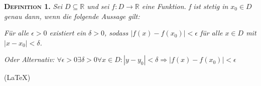 \documentclass[14pt,a4paper]{extarticle}
\begin{document}
    \noindent\textbf{\textsc{Definition 1.}} \textit{Sei $D \subseteq \mathbb{R}$ und sei $f: D \rightarrow \mathbb{R}$ eine Funktion. f ist stetig in $x_0 \in D$ genau dann, wenn die folgende Aussage gilt:}

    \textit{Für alle $\epsilon > 0$ existiert ein $\delta > 0$, sodass $| f(x)-f(x_0) | < \epsilon$ für alle $x \in D$ mit $| x-x_0 | < \delta$.}

    \textit{Oder Alternativ: $\forall \epsilon > 0 \exists \delta > 0 \forall x \in D : |y-y_0| < \delta \Rightarrow |f(x)-f(x_0)| < \epsilon$}

    \bigskip
    (\LaTeX)
\end{document}
